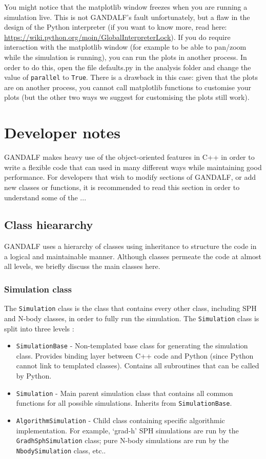 \documentclass[a4paper]{article}
\newcommand{\var}[1]{\texttt{#1}}
\begin{document}
You might notice that the matplotlib window freezes when you are running a simulation live. This is not GANDALF's fault unfortunately, but a flaw in the design of the Python interpreter (if you want to know more, read here: \url{https://wiki.python.org/moin/GlobalInterpreterLock}). If you do require interaction with the matplotlib window (for example to be able to pan/zoom while the simulation is running), you can run the plots in another process. In order to do this, open the file defaults.py in the analysis folder and change the value of \var{parallel} to \lstinline{True}. There is a drawback in this case: given that the plots are on another process, you cannot call matplotlib functions to customise your plots (but the other two ways we suggest for customising the plots still work).

\newpage


\section{Developer notes}
GANDALF makes heavy use of the object-oriented features in C++ in order to write a flexible code that can used in many different ways while maintaining good performance.  For developers that wish to modify sections of GANDALF, or add new classes or functions, it is recommended to read this section in order to understand some of the ...


\subsection{Class hieararchy}
GANDALF uses a hierarchy of classes using inheritance to structure the code in a logical and maintainable manner.  Although classes permeate the code at almost all levels, we briefly discuss the main classes here.

\subsubsection{Simulation class}
The \var{Simulation} class is the class that contains every other class, including SPH and N-body classes, in order to fully run the simulation.  The \var{Simulation} class is split into three levels :
\begin{itemize}
\item \var{SimulationBase} - Non-templated base class for generating the simulation class.  Provides binding layer between C++ code and Python (since Python cannot link to templated classes).  Contains all subroutines that can be called by Python.
\item \var{Simulation} - Main parent simulation class that contains all common functions for all possible simulations.  Inherits from \var{SimulationBase}.
\item \var{AlgorithmSimulation} - Child class containing specific algorithmic implementation.  For example, `grad-h' SPH simulations are run by the \var{GradhSphSimulation} class; pure N-body simulations are run by the \var{NbodySimulation} class, etc..
\end{itemize}
\end{document}
